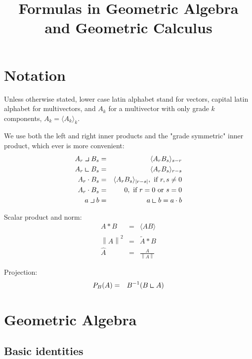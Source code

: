 \documentclass[a4paper,12pt]{article}
\title{Formulas in Geometric Algebra and Geometric Calculus}
\author{}
\newcommand{\grade}[2]{\ensuremath{\langle#2\rangle_{#1}}}
\newcommand{\reverse}[1]{\tilde{#1}} %
\newcommand{\linner}{\mathbin{\ensuremath{\scalebox{1.4}{$\lrcorner$}}}}
\newcommand{\rinner}{\mathbin{\ensuremath{\scalebox{1.4}{$\llcorner$}}}}
\providecommand{\abs}[1]{\lvert#1\rvert}
\providecommand{\norm}[1]{\left\lVert#1\right\rVert}
\providecommand{\normed}[1]{\hat{#1}}
\begin{document}
\maketitle

\section{Notation}

Unless otherwise stated, lower case latin alphabet stand for vectors, capital latin alphabet for multivectors, and $A_k$ for a multivector with only grade $k$ components, $A_k = \grade{k}{A_k}$.

We use both the left and right inner products and the "grade symmetric" inner product, which ever is more convenient:
\begin{eqnarray}
A_r \linner B_s &=& \grade{s-r}{A_r B_s}\\
A_r \rinner B_s &=& \grade{r-s}{A_r B_s}\\
A_r \cdot B_s &=& \grade{\abs{r-s}}{A_r B_s},\ \textrm{if}\ r, s \neq 0\\
A_r \cdot B_s &=& 0,\ \textrm{if}\ r = 0\ \textrm{or}\ s = 0\\
a \linner b &=& a \rinner b = a \cdot b
\end{eqnarray}

Scalar product and norm:
\begin{eqnarray}
 A * B &=& \grade{}{AB}\\
 \norm{A}^2 &=& \reverse{A} * B\\
 \normed{A} &=& \frac{A}{\norm{A}}
\end{eqnarray}

Projection:
\begin{eqnarray}
 P_B(A) &=& B^{-1}(B \rinner A)
\end{eqnarray}

\section{Geometric Algebra}

\subsection{Basic identities}
\end{document}
